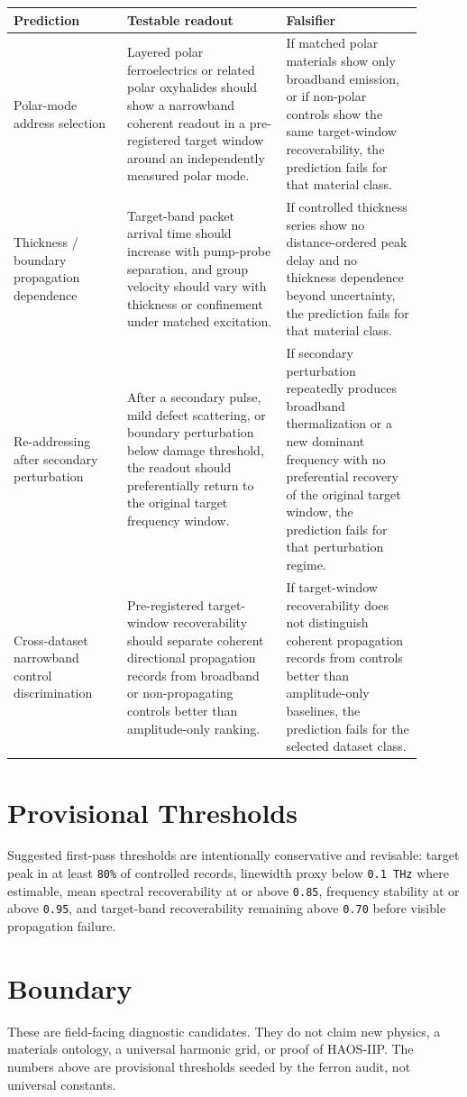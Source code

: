 \documentclass[11pt]{article}
\begin{document}
\begin{center}
\begin{tabular}{p{0.25\linewidth}p{0.35\linewidth}p{0.30\linewidth}}
\toprule
Prediction & Testable readout & Falsifier \\
\midrule
Polar-mode address selection &
Layered polar ferroelectrics or related polar oxyhalides should show a
narrowband coherent readout in a pre-registered target window around an
independently measured polar mode. &
If matched polar materials show only broadband emission, or if non-polar
controls show the same target-window recoverability, the prediction fails for
that material class. \\
\addlinespace
Thickness / boundary propagation dependence &
Target-band packet arrival time should increase with pump-probe separation, and
group velocity should vary with thickness or confinement under matched
excitation. &
If controlled thickness series show no distance-ordered peak delay and no
thickness dependence beyond uncertainty, the prediction fails for that material
class. \\
\addlinespace
Re-addressing after secondary perturbation &
After a secondary pulse, mild defect scattering, or boundary perturbation below
damage threshold, the readout should preferentially return to the original
target frequency window. &
If secondary perturbation repeatedly produces broadband thermalization or a new
dominant frequency with no preferential recovery of the original target window,
the prediction fails for that perturbation regime. \\
\addlinespace
Cross-dataset narrowband control discrimination &
Pre-registered target-window recoverability should separate coherent
directional propagation records from broadband or non-propagating controls
better than amplitude-only ranking. &
If target-window recoverability does not distinguish coherent propagation
records from controls better than amplitude-only baselines, the prediction
fails for the selected dataset class. \\
\bottomrule
\end{tabular}
\end{center}

\section*{Provisional Thresholds}

Suggested first-pass thresholds are intentionally conservative and revisable:
target peak in at least \texttt{80\%} of controlled records, linewidth proxy
below \texttt{0.1 THz} where estimable, mean spectral recoverability at or above
\texttt{0.85}, frequency stability at or above \texttt{0.95}, and target-band
recoverability remaining above \texttt{0.70} before visible propagation failure.

\section*{Boundary}

These are field-facing diagnostic candidates. They do not claim new physics, a
materials ontology, a universal harmonic grid, or proof of HAOS-IIP. The
numbers above are provisional thresholds seeded by the ferron audit, not
universal constants.
\end{document}
